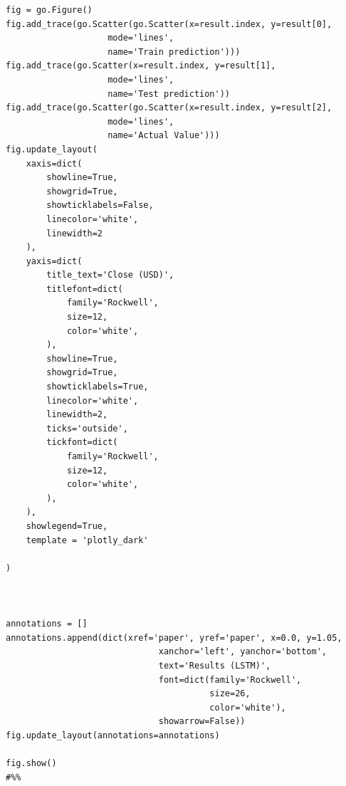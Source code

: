 \documentclass[stu,12pt,floatsintext]{apa7}
\begin{document}
\begin{verbatim}
fig = go.Figure()
fig.add_trace(go.Scatter(go.Scatter(x=result.index, y=result[0],
                    mode='lines',
                    name='Train prediction')))
fig.add_trace(go.Scatter(x=result.index, y=result[1],
                    mode='lines',
                    name='Test prediction'))
fig.add_trace(go.Scatter(go.Scatter(x=result.index, y=result[2],
                    mode='lines',
                    name='Actual Value')))
fig.update_layout(
    xaxis=dict(
        showline=True,
        showgrid=True,
        showticklabels=False,
        linecolor='white',
        linewidth=2
    ),
    yaxis=dict(
        title_text='Close (USD)',
        titlefont=dict(
            family='Rockwell',
            size=12,
            color='white',
        ),
        showline=True,
        showgrid=True,
        showticklabels=True,
        linecolor='white',
        linewidth=2,
        ticks='outside',
        tickfont=dict(
            family='Rockwell',
            size=12,
            color='white',
        ),
    ),
    showlegend=True,
    template = 'plotly_dark'

)



annotations = []
annotations.append(dict(xref='paper', yref='paper', x=0.0, y=1.05,
                              xanchor='left', yanchor='bottom',
                              text='Results (LSTM)',
                              font=dict(family='Rockwell',
                                        size=26,
                                        color='white'),
                              showarrow=False))
fig.update_layout(annotations=annotations)

fig.show()
#%%
\end{verbatim}
\end{document}
